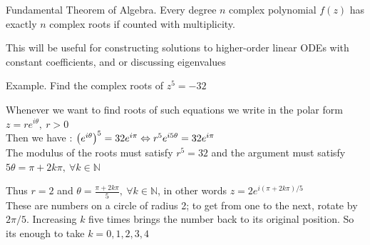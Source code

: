 \documentclass[11pt, openright]{book}
\begin{document}
\begin{dent}{Fundamental Theorem of Algebra.}
    Every degree $n$ complex polynomial $f(z)$ has exactly $n$ complex roots if counted with multiplicity.
\end{dent}
\vspace{-6pt}

This will be useful for constructing solutions to higher-order linear ODEs with constant coefficients, and or discussing eigenvalues\vspace{-7pt}

\begin{dent}{Example.}
    Find the complex roots of $z^5=-32$

    Whenever we want to find roots of such equations we write in the polar form $z=re^{i\theta},\ r>0$\\
    Then we have : $\left( e^{i\theta} \right)^{5}=32e^{i\pi}\Leftrightarrow r^5e^{i5\theta}=32e^{i\pi}$\\
    The modulus of the roots must satisfy $r^5=32$ and the argument must satisfy $5\theta=\pi+2k\pi,\ \forall k\in\mathbb{N}$

    Thus $r=2$ and $\theta=\frac{\pi+2k\pi}{5},\ \forall k\in\mathbb{N}$, in other words $z=2e^{i(\pi+2k\pi)/5}$\\
    These are numbers on a circle of radius 2; to get from one to the next, rotate by $2\pi/5$. Increasing $k$ five times brings the number back to its original position. So its enough to take $k=0,1,2,3,4$
\end{dent}

\begin{figure}[ht]
    \centering
\end{figure}
\end{document}
